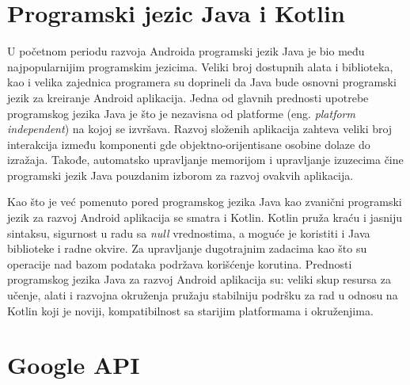\documentclass[../TamaraIvanovicMasterRad.tex]{subfiles}
\begin{document}
\section{Programski jezic Java i Kotlin}
U početnom periodu razvoja Androida programski jezik Java je bio među najpopularnijim programskim jezicima. Veliki broj dostupnih alata i biblioteka, kao i velika zajednica programera su doprineli da Java bude osnovni programski jezik za kreiranje Android aplikacija. Jedna od glavnih prednosti upotrebe programskog jezika Java je što je nezavisna od platforme (eng. \textit{platform independent}) na kojoj se izvršava. Razvoj složenih aplikacija zahteva veliki broj interakcija između komponenti gde objektno-orijentisane osobine dolaze do izražaja. Takođe, automatsko upravljanje memorijom i upravljanje izuzecima čine programski jezik Java pouzdanim izborom za razvoj ovakvih aplikacija. 

Kao što je već pomenuto pored programskog jezika Java kao zvanični programski jezik za razvoj Android aplikacija se smatra i Kotlin. Kotlin pruža kraću i jasniju sintaksu, sigurnost u radu sa \textit{null} vrednostima, a moguće je koristiti i Java biblioteke i radne okvire. Za upravljanje dugotrajnim zadacima kao što su operacije nad bazom podataka podržava korišćenje korutina. Prednosti programskog jezika Java za razvoj Android aplikacija su: veliki skup resursa za učenje, alati i razvojna okruženja pružaju stabilniju podršku za rad u odnosu na Kotlin koji je noviji, kompatibilnost sa starijim platformama i okruženjima.


\section{Google API}\label{sec:google}

\end{document}
